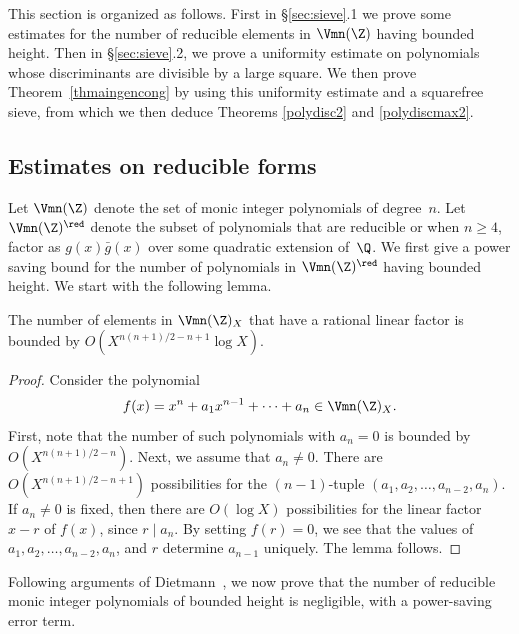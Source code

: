 This section is organized as follows. First in \S\ref{sec:sieve}.1 we
prove some estimates for the number of reducible elements in
$\Vmn(\Z)$ having bounded height.  Then in \S\ref{sec:sieve}.2, we
prove a uniformity estimate on polynomials whose discriminants are
divisible by a large square.  We then prove Theorem~\ref{thmaingencong} by
using this uniformity estimate and a squarefree sieve, from which we then deduce Theorems \ref{polydisc2} and
\ref{polydiscmax2}.


\subsection{Estimates on reducible forms}

Let $\Vmn(\Z)$ denote the set of monic integer polynomials of
degree~$n$. Let $\Vmn(\Z)^\red$ denote the subset of polynomials that
are reducible or when $n\geq 4$, factor as $g(x)\bar{g}(x)$ over some
quadratic extension of~$\Q$.   We first
give a power saving bound for the number of polynomials in
$\Vmn(\Z)^\red$ having bounded height. We start with the following
lemma.

\begin{lemma}
\notready\label{lemlin}
The number of elements in $\Vmn(\Z)_X$ that have a rational linear factor
is bounded by $O(X^{n(n+1)/2-n+1}\log X)$.
\end{lemma}
\begin{proof}
  Consider the polynomial
\begin{equation*}
  f(x)=x^n+a_{1}x^{n-1}+\cdots +a_n\in \Vmn(\Z)_X.
\end{equation*}
First, note that the number of such polynomials with $a_n=0$ is bounded
by $O(X^{n(n+1)/2-n})$. Next, we assume that $a_n\neq 0$. There are
$O(X^{n(n+1)/2-n+1})$ possibilities for the $(n-1)$-tuple
$(a_1,a_2,\ldots,a_{n-2},a_n)$. If $a_n\neq 0$ is fixed, then there
are $O(\log X)$ possibilities for the linear factor $x-r$ of $f(x)$,
since $r\mid a_n$. By setting $f(r)=0$, we see that the
values of $a_1,a_2,\ldots,a_{n-2},a_n$, and $r$ determine $a_{n-1}$
uniquely. The lemma follows.
\end{proof}

Following arguments of Dietmann~\cite{Dietmann}, we now prove that the number of reducible monic
integer polynomials of bounded height is negligible, with a power-saving error term.


